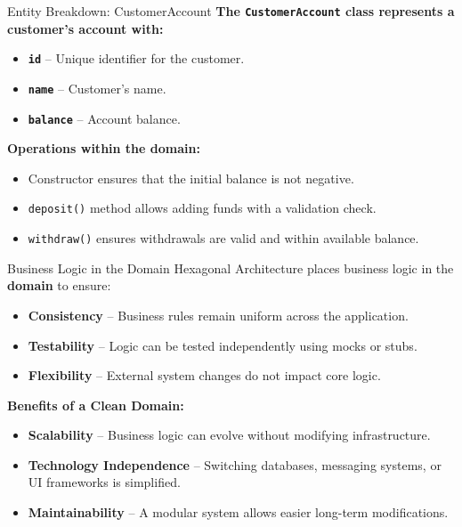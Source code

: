 \documentclass[aspectratio=169, table]{beamer}
\begin{document}
\begin{frame}[fragile]{Entity Breakdown: CustomerAccount}
	\vspace{20pt}
	\textbf{The \texttt{CustomerAccount} class represents a customer’s account with:}
	\begin{itemize}
		\item \textbf{\texttt{id}} – Unique identifier for the customer.
		\item \textbf{\texttt{name}} – Customer’s name.
		\item \textbf{\texttt{balance}} – Account balance.
	\end{itemize}
	
	\textbf{Operations within the domain:}
	\begin{itemize}
		\item Constructor ensures that the initial balance is not negative.
		\item \texttt{deposit()} method allows adding funds with a validation check.
		\item \texttt{withdraw()} ensures withdrawals are valid and within available balance.
	\end{itemize}
\end{frame}

\begin{frame}[fragile]{Business Logic in the Domain}
	\vspace{20pt}
	Hexagonal Architecture places business logic in the \textbf{domain} to ensure:
	\begin{itemize}
		\item \textbf{Consistency} – Business rules remain uniform across the application.
		\item \textbf{Testability} – Logic can be tested independently using mocks or stubs.
		\item \textbf{Flexibility} – External system changes do not impact core logic.
	\end{itemize}
	
	\textbf{Benefits of a Clean Domain:}
	\begin{itemize}
		\item \textbf{Scalability} – Business logic can evolve without modifying infrastructure.
		\item \textbf{Technology Independence} – Switching databases, messaging systems, or UI frameworks is simplified.
		\item \textbf{Maintainability} – A modular system allows easier long-term modifications.
	\end{itemize}
\end{frame}
\end{document}
